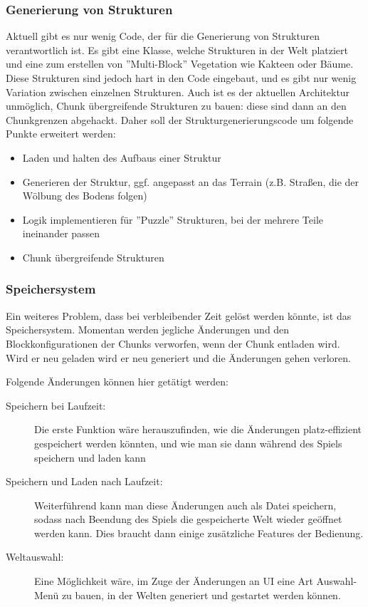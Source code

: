 \documentclass{article}
\begin{document}
\subsubsection{Generierung von Strukturen}

Aktuell gibt es nur wenig Code, der für die Generierung von Strukturen
verantwortlich ist. Es gibt eine Klasse, welche Strukturen in der Welt platziert
und eine zum erstellen von ''Multi-Block'' Vegetation wie Kakteen oder Bäume.
Diese Strukturen sind jedoch hart in den Code eingebaut, und es gibt nur wenig
Variation zwischen einzelnen Strukturen. Auch ist es der aktuellen Architektur
unmöglich, Chunk übergreifende Strukturen zu bauen: diese sind dann an den
Chunkgrenzen abgehackt. Daher soll der Strukturgenerierungscode um folgende
Punkte erweitert werden:

\begin{itemize}
	\item Laden und halten des Aufbaus einer Struktur
	\item Generieren der Struktur, ggf. angepasst an das Terrain (z.B. Stra\ss{}en,
	die der Wölbung des Bodens folgen)
	\item Logik implementieren für ''Puzzle'' Strukturen, bei der mehrere Teile
	ineinander passen
	\item Chunk übergreifende Strukturen
\end{itemize}

\subsubsection{Speichersystem}

Ein weiteres Problem, dass bei verbleibender Zeit gelöst werden könnte, ist das Speichersystem. Momentan werden jegliche Änderungen und den Blockkonfigurationen der Chunks verworfen, wenn der Chunk entladen wird. Wird er neu geladen wird er neu generiert und die Änderungen gehen verloren. 

Folgende Änderungen können hier getätigt werden:

\begin{description}
  \item[Speichern bei Laufzeit:] Die erste Funktion wäre herauszufinden, wie die Änderungen platz-effizient gespeichert werden könnten, und wie man sie dann während des Spiels speichern und laden kann
  \item[Speichern und Laden nach Laufzeit:] Weiterführend kann man diese Änderungen auch als Datei speichern, sodass nach Beendung des Spiels die gespeicherte Welt wieder geöffnet werden kann. Dies braucht dann einige zusätzliche Features der Bedienung.
  \item[Weltauswahl:] Eine Möglichkeit wäre, im Zuge der Änderungen an UI eine Art Auswahl-Menü zu bauen, in der Welten generiert und gestartet werden können.
\end{description}
\end{document}
